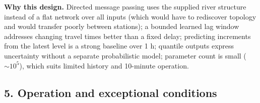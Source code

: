 \noindent\textbf{Why this design.} Directed message passing uses the supplied river structure instead of a flat network over all inputs (which would have to rediscover topology
and would transfer poorly between stations); a bounded learned lag window addresses changing travel times better than a fixed delay; predicting increments from the latest level
is a strong baseline over 1 h; quantile outputs express uncertainty without a separate probabilistic model; parameter count is small ($\sim10^{5}$), which suits limited history and 10-minute operation.

\subsection*{5. Operation and exceptional conditions}
\small
